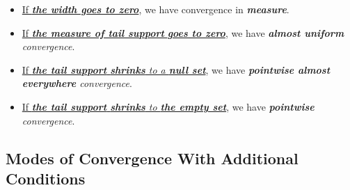 \documentclass[11pt]{article}
\begin{document}
\begin{itemize}
\begin{remark}
\begin{itemize}
\begin{itemize}
\item \underline{If \emph{\textbf{the width goes to zero}}}, we have convergence in \emph{\textbf{measure}}.

\item \underline{If \emph{\textbf{the measure of tail support}} \emph{\textbf{goes to zero}}}, we have \emph{\textbf{almost uniform} convergence}.

\item \underline{If \emph{\textbf{the tail support} \textbf{shrinks} to a \textbf{null set}}}, we have \emph{\textbf{pointwise almost everywhere} convergence}.

\item \underline{If \emph{\textbf{the tail support} \textbf{shrinks} to \textbf{the empty set}}}, we have \emph{\textbf{pointwise} convergence}. 
\end{itemize}
\end{itemize}
\end{remark}   
\end{itemize}
\subsection{Modes of Convergence With Additional Conditions}
\end{document}

